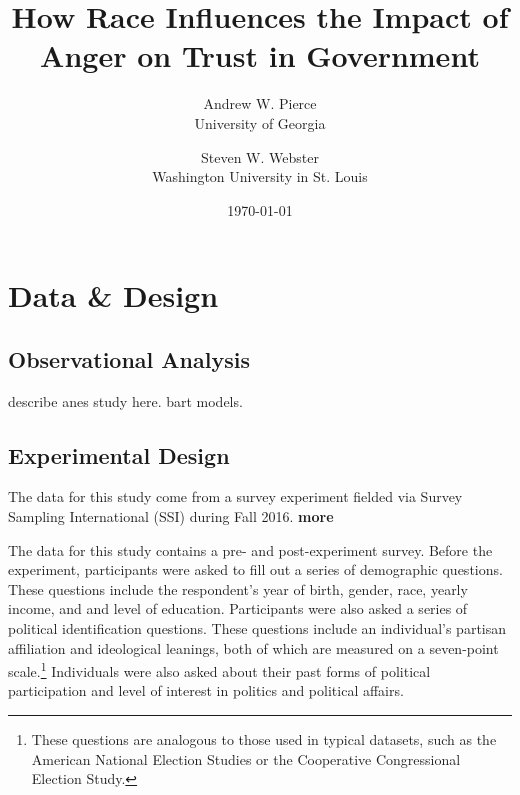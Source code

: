 \documentclass[12pt, letterpaper]{article}
\author{Andrew W. Pierce \\ University of Georgia \and Steven W. Webster \\ Washington University in St. Louis}
\title{How Race Influences the Impact of Anger on Trust in Government}
\date{\today}
\begin{document}
%

\begin{titlepage}
\maketitle

\thispagestyle{empty}

\begin{singlespacing}
\end{singlespacing}

\end{titlepage}


\newpage
\setcounter{page}{1}

\doublespacing

\section{Data \& Design}
\label{sec:design}

\subsection{Observational Analysis}
\label{subsec:anes}

 describe anes study here. bart models.

\subsection{Experimental Design}
\label{subsec:experiment}

The data for this study come from a survey experiment fielded via Survey Sampling International (SSI) during Fall 2016.  \textbf{more}

The data for this study contains a pre- and post-experiment survey. Before the experiment, participants were asked to fill out a series of demographic questions. These questions include the respondent's year of birth, gender, race, yearly income, and and level of education. Participants were also asked a series of political identification questions. These questions include an individual's partisan affiliation and ideological leanings, both of which are measured on a seven-point scale.\footnote{These questions are analogous to those used in typical datasets, such as the American National Election Studies or the Cooperative Congressional Election Study.} Individuals were also asked about their past forms of political participation and level of interest in politics and political affairs.
\end{document}
